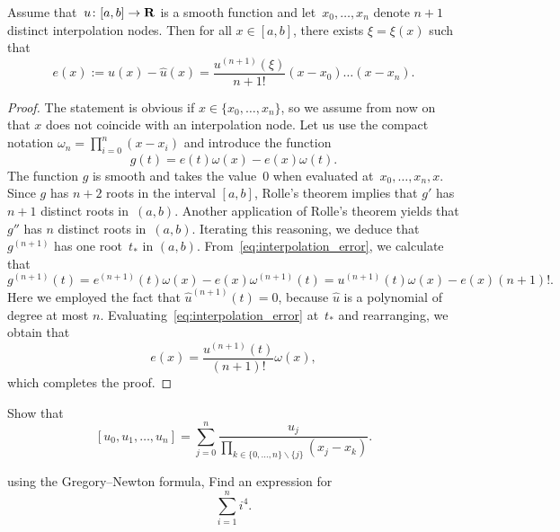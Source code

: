 \begin{theorem}
    Assume that~$u\colon [a, b] \to \mathbf R$ is a smooth function and let~$x_0, \dotsc, x_n$ denote $n+1$ distinct interpolation nodes.
    Then for all $x \in [a, b]$,
    there exists $\xi = \xi(x)$ such that
    \[
        e(x) := u(x) - \widehat u(x) = \frac{u^{(n+1)}(\xi)}{n+1!} (x-x_0) \dotsc (x - x_n).
    \]
\end{theorem}
\begin{proof}
    The statement is obvious if $x \in \{x_0, \dotsc, x_n\}$,
    so we assume from now on that $x$ does not coincide with an interpolation node.
    Let us use the compact notation $\omega_n = \prod_{i=0}^n (x - x_i)$ and introduce the function
    \begin{equation}
        \label{eq:interpolation_error}
        g(t) = e(t) \omega(x) - e(x) \omega(t).
    \end{equation}
    The function $g$ is smooth and takes the value~0 when evaluated at~$x_0, \dotsc, x_n, x$.
    Since $g$ has $n+2$ roots in the interval $[a, b]$,
    Rolle's theorem implies that $g'$ has $n+1$ distinct roots in~$(a, b)$.
    Another application of Rolle's theorem yields that $g''$ has $n$ distinct roots in~$(a, b)$.
    Iterating this reasoning, we deduce that $g^{(n+1)}$ has one root~$t_*$ in $(a, b)$.
    From~\eqref{eq:interpolation_error},
    we calculate that
    \begin{equation}
        \label{eq:interpolation_error}
        g^{(n+1)}(t) = e^{(n+1)}(t) \omega(x) - e(x) \omega^{(n+1)}(t)
        = u^{(n+1)}(t) \omega(x) - e(x) (n+1)!.
    \end{equation}
    Here we employed the fact that $\widehat u^{(n+1)}(t) = 0$,
    because $\widehat u$ is a polynomial of degree at most $n$.
    Evaluating~\eqref{eq:interpolation_error} at~$t_*$ and rearranging,
    we obtain that
    \[
        e(x) = \frac{u^{(n+1)}(t)}{(n+1)!} \omega(x),
    \]
    which completes the proof.
\end{proof}


\begin{exercise}
    \label{exercise:divided_differences}
    Show that
    \[
        [u_{0}, u_{1}, \dotsc, u_{n}] = \sum_{j=0}^{n} \frac{u_{j}}{\prod_{ k \in \{0, \dotsc, n\} \backslash \{ j\}} (x_{j} - x_{k})}.
    \]
\end{exercise}

\begin{exercise}
    using the Gregory--Newton formula,
    Find an expression for
    \[
        \sum_{i=1}^{n} i^4.
    \]
\end{exercise}

